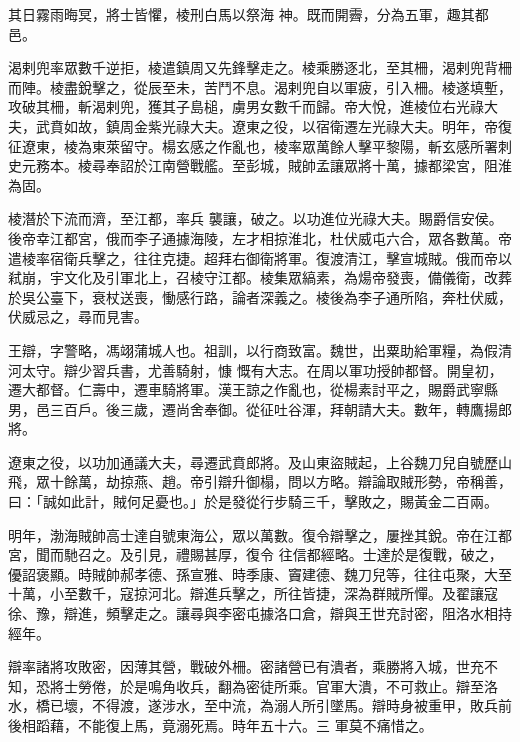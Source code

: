 \begin{pinyinscope}
 其日霧雨晦冥，將士皆懼，棱刑白馬以祭海
 神。既而開霽，分為五軍，趣其都邑。



 渴剌兜率眾數千逆拒，棱遣鎮周又先鋒擊走之。棱乘勝逐北，至其柵，渴剌兜背柵而陣。棱盡銳擊之，從辰至未，苦鬥不息。渴剌兜自以軍疲，引入柵。棱遂填塹，攻破其柵，斬渴剌兜，獲其子島槌，虜男女數千而歸。帝大悅，進棱位右光祿大夫，武賁如故，鎮周金紫光祿大夫。遼東之役，以宿衛遷左光祿大夫。明年，帝復征遼東，棱為東萊留守。楊玄感之作亂也，棱率眾萬餘人擊平黎陽，斬玄感所署刺史元務本。棱尋奉詔於江南營戰艦。至彭城，賊帥孟讓眾將十萬，據都梁宮，阻淮為固。



 棱潛於下流而濟，至江都，率兵
 襲讓，破之。以功進位光祿大夫。賜爵信安侯。後帝幸江都宮，俄而李子通據海陵，左才相掠淮北，杜伏威屯六合，眾各數萬。帝遣棱率宿衛兵擊之，往往克捷。超拜右御衛將軍。復渡清江，擊宣城賊。俄而帝以弒崩，宇文化及引軍北上，召棱守江都。棱集眾縞素，為煬帝發喪，備儀衛，改葬於吳公臺下，衰杖送喪，慟感行路，論者深義之。棱後為李子通所陷，奔杜伏威，伏威忌之，尋而見害。



 王辯，字警略，馮翊蒲城人也。祖訓，以行商致富。魏世，出粟助給軍糧，為假清河太守。辯少習兵書，尤善騎射，慷
 慨有大志。在周以軍功授帥都督。開皇初，遷大都督。仁壽中，遷車騎將軍。漢王諒之作亂也，從楊素討平之，賜爵武寧縣男，邑三百戶。後三歲，遷尚舍奉御。從征吐谷渾，拜朝請大夫。數年，轉鷹揚郎將。



 遼東之役，以功加通議大夫，尋遷武賁郎將。及山東盜賊起，上谷魏刀兒自號歷山飛，眾十餘萬，劫掠燕、趙。帝引辯升御榻，問以方略。辯論取賊形勢，帝稱善，曰：「誠如此計，賊何足憂也。」於是發從行步騎三千，擊敗之，賜黃金二百兩。



 明年，渤海賊帥高士達自號東海公，眾以萬數。復令辯擊之，屢挫其銳。帝在江都宮，聞而馳召之。及引見，禮賜甚厚，復令
 往信都經略。士達於是復戰，破之，優詔褒顯。時賊帥郝孝德、孫宣雅、時季康、竇建德、魏刀兒等，往往屯聚，大至十萬，小至數千，寇掠河北。辯進兵擊之，所往皆捷，深為群賊所憚。及翟讓寇徐、豫，辯進，頻擊走之。讓尋與李密屯據洛口倉，辯與王世充討密，阻洛水相持經年。



 辯率諸將攻敗密，因薄其營，戰破外柵。密諸營已有潰者，乘勝將入城，世充不知，恐將士勞倦，於是鳴角收兵，翻為密徒所乘。官軍大潰，不可救止。辯至洛水，橋已壞，不得渡，遂涉水，至中流，為溺人所引墜馬。辯時身被重甲，敗兵前後相蹈藉，不能復上馬，竟溺死焉。時年五十六。三
 軍莫不痛惜之。




\end{pinyinscope}
